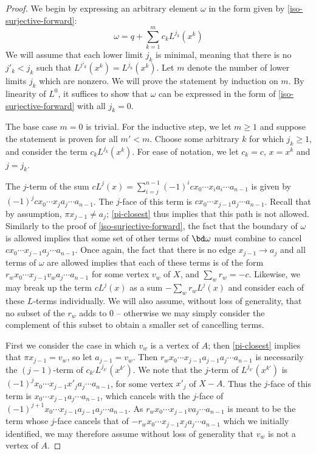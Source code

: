 \begin{proof}
We begin by expressing an arbitrary element $\omega$ in the form given by \cref{iso-surjective-forward}:
\[
\omega = q + \sum_{k=1}^m c_k L^{j_k}(x^k) 
\]
We will assume that each lower limit $j_k$ is minimal, meaning that there is no $j'_k < j_k$ such that $L^{j'_k}(x^k) = L^{j_k}(x^k)$. 
Let $m$ denote the number of lower limits $j_k$ which are nonzero. 
We will prove the statement by induction on $m$. 
By linearity of $L^0$, it suffices to show that $\omega$ can be expressed in the form of \cref{iso-surjective-forward} with all $j_k = 0$. 

The base case $m = 0$ is trivial.
For the inductive step, we let $m \geq 1$ and suppose the statement is proven for all $m' < m$. Choose some arbitrary $k$ for which $j_k \geq 1$, and consider the term $c_k L^{j_k}(x^k)$. For ease of notation, we let $c_k = c$, $x = x^k$ and $j = j_k$.

The $j$-term of the sum $c L^j(x) = \sum_{i = j}^{n-1} (-1)^i c x_0 \cdots x_i a_i \cdots a_{n-1}$ is given by $(-1)^{j} c x_0 \cdots x_j a_j \cdots a_{n-1}$. The $j$-face of this term is $c x_0 \cdots x_{j-1} a_{j} \cdots a_{n-1}$. Recall that by assumption, $\pi x_{j-1} \neq a_j$; \cref{pi-closest} thus implies that this path is not allowed. Similarly to the proof of \cref{iso-surjective-forward}, the fact that the boundary of $\omega$ is allowed implies that some set of other terms of $\bd \omega$ must combine to cancel $c x_0 \cdots x_{j-1} a_{j} \cdots a_{n-1}$. Once again, the fact that there is no edge $x_{j-1} \to a_j$ and all terms of $\omega$ are allowed implies that each of these terms is of the form $r_w x_0 \cdots x_{j-1} v_w a_{j} \cdots a_{n-1}$ for some vertex $v_w$ of $X$, and $\sum_w r_w = -c$. Likewise, we may break up the term $c L^j(x)$ as a sum $-\sum_w r_w L^j(x)$ and consider each of these $L$-terms individually. 
We will also assume, without loss of generality, that no subset of the $r_w$ adds to 0 -- otherwise we may simply consider the complement of this subset to obtain a smaller set of cancelling terms.

First we consider the case in which $v_w$ is a vertex of $A$; then \cref{pi-closest} implies that $\pi x_{j-1} = v_w$, so let $a_{j-1} = v_w$. Then $r_w x_0 \cdots x_{j-1} a_{j-1} a_{j} \cdots a_{n-1}$ is necessarily the $(j-1)$-term of $c_{k'}L^{j_{k'}}(x^{k'})$. We note that the $j$-term of $L^{j_{k'}}(x^{k'})$ is $(-1)^{j}x_0 \cdots x_{j-1} x'_{j} a_{j} \cdots a_{n-1}$, for some vertex $x'_j$ of $X-A$. Thus the $j$-face of this term is $x_0 \cdots x_{j-1} a_{j} \cdots a_{n-1}$, which cancels with the $j$-face of $(-1)^{j+1}x_0 \cdots x_{j-1} a_{j-1} a_{j} \cdots a_{n-1}$. As $r_w x_0 \cdots x_{j-1} v a_{j} \cdots a_{n-1}$ is meant to be the term whose $j$-face cancels that of $-r_w x_0 \cdots x_{j-1} x_j a_{j} \cdots a_{n-1}$ which we initially identified, we may therefore assume without loss of generality that $v_w$ is not a vertex of $A$.


\end{proof}
